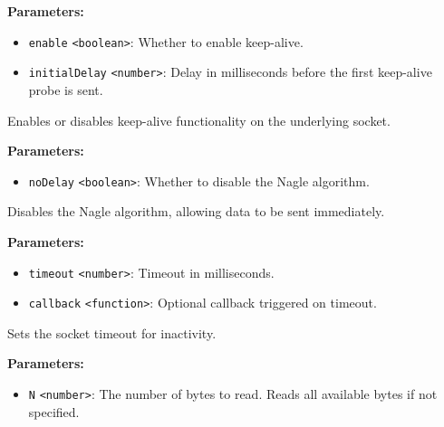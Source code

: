 \documentclass[12pt,a4paper]{article}
\begin{document}
\noindent \textbf{Parameters:}
\begin{itemize}
  \item \texttt{enable} \texttt{<boolean>}: Whether to enable keep-alive.
  \item \texttt{initialDelay} \texttt{<number>}: Delay in milliseconds before the first keep-alive probe is sent.
\end{itemize}

\noindent Enables or disables keep-alive functionality on the underlying socket.

\vspace{5mm}
\noindent {}


\noindent \textbf{Parameters:}
\begin{itemize}
  \item \texttt{noDelay} \texttt{<boolean>}: Whether to disable the Nagle algorithm.
\end{itemize}

\noindent Disables the Nagle algorithm, allowing data to be sent immediately.

\vspace{5mm}
\noindent {}


\noindent \textbf{Parameters:}
\begin{itemize}
  \item \texttt{timeout} \texttt{<number>}: Timeout in milliseconds.
  \item \texttt{callback} \texttt{<function>}: Optional callback triggered on timeout.
\end{itemize}

\noindent Sets the socket timeout for inactivity.

\vspace{5mm}
\noindent {}


\noindent \textbf{Parameters:}
\begin{itemize}
  \item \texttt{N} \texttt{<number>}: The number of bytes to read. Reads all available bytes if not specified.
\end{itemize}
\end{document}
